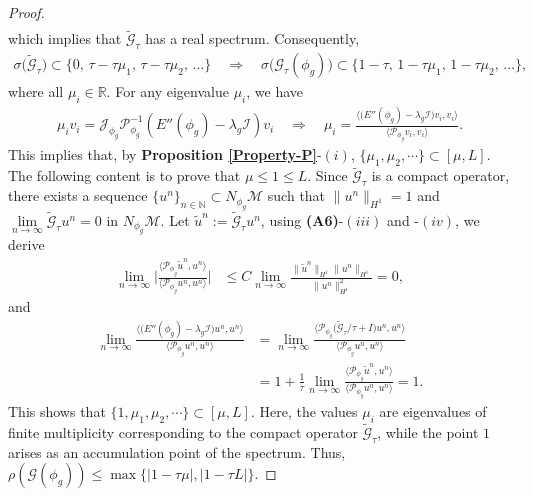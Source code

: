 \documentclass[preprint,3p]{elsarticle}
\begin{document}
\begin{proof}
{\begin{align*}
	\end{align*}
	which implies that $\widetilde{\mathcal{G}}_{\tau}$ has a real spectrum. Consequently,
	\begin{align*}
		\sigma\big(\widetilde{\mathcal{G}}_{\tau}\big) \subset \big\{0,\, \tau - \tau\mu_1,\, \tau - \tau\mu_2,\, \dots \big\}
		\quad \Longrightarrow \quad
		\sigma\big(\mathcal{G}_{\tau}(\phi_g)\big) \subset \big\{1 - \tau,\, 1 - \tau\mu_1,\, 1 - \tau\mu_2,\, \dots \big\},
	\end{align*}
	where all $\mu_i \in \mathbb{R}$.} For any eigenvalue $\mu_i$, we have
	\begin{align*}
		\mu_iv_i=\mathcal{J}_{\phi_g}\mathcal{P}^{-1}_{\phi_g} \left(E''(\phi_g) - \lambda_g \mathcal{I}\right)v_i\quad\Longrightarrow\quad\mu_i=\frac{\big\langle\big(E''(\phi_g)-\lambda_g\mathcal{I}\big)v_i,v_i\big\rangle}{\big\langle\mathcal{P}_{\phi_g}v_i,v_i\big\rangle}.
	\end{align*}
	This implies that, by {\bf Proposition \ref{Property-P}}-$(i)$, $\big\{\mu_1,\mu_2,\cdots\big\}\subset[\mu,L]$. The following content is to prove that $\mu\le1\le L$. Since $\widetilde{\mathcal{G}}_{\tau}$ is a compact operator, there exists a sequence $\{u^n\}_{n\in\mathbb{N}}\subset N_{\phi_g}\mathcal{M}$ such that $\big\|u^n\big\|_{H^1}=1$ and $\lim\limits_{n\to\infty}\widetilde{\mathcal{G}}_{\tau}u^n=0$ in $N_{\phi_g}\mathcal{M}$. Let $\widetilde{u}^n:=\widetilde{\mathcal{G}}_{\tau}u^n$, using {\bf(A6)}-$(iii)$ and -$(iv)$, we derive
	\begin{align*}
		\lim\limits_{n\to\infty}\Bigg|\frac{\big\langle\mathcal{P}_{\phi_g}\widetilde{u}^n,u^n\big\rangle}{\big\langle\mathcal{P}_{\phi_g}u^n,u^n\big\rangle}\Bigg|&\le C\lim\limits_{n\to\infty} 	\frac{\big\|\widetilde{u}^n\big\|_{H^1}\big\|u^n\big\|_{H^1}}{\big\|u^n\big\|^2_{H^1}}=0,
	\end{align*}
	and
	\begin{align*}
		\lim\limits_{n\to\infty}\frac{\big\langle\big(E''(\phi_g)-\lambda_g\mathcal{I}\big)u^n,u^n\big\rangle}{\big\langle\mathcal{P}_{\phi_g}u^n,u^n\big\rangle}&=\lim\limits_{n\to\infty}\frac{\big\langle\mathcal{P}_{\phi_g}\big(\widetilde{\mathcal{G}}_{\tau}/\tau+I\big)u^n,u^n\big\rangle}{\big\langle\mathcal{P}_{\phi_g}u^n,u^n\big\rangle}\\
		&=1+\frac{1}{\tau}\lim\limits_{n\to\infty}\frac{\big\langle\mathcal{P}_{\phi_g}\widetilde{u}^n,u^n\big\rangle}{\big\langle\mathcal{P}_{\phi_g}u^n,u^n\big\rangle}=1.
	\end{align*}
	This shows that $\big\{1,\mu_1,\mu_2,\cdots\big\}\subset[\mu,L]$. {Here, the values $\mu_i$ are eigenvalues of finite multiplicity corresponding to the compact operator $\widetilde{\mathcal{G}}_{\tau}$, while the point $1$ arises as an accumulation point of the spectrum.} Thus, $\rho\left(\mathcal{G}(\phi_g)\right) \le\max\big\{|1-\tau\mu|,|1-\tau L|\big\}$.
\end{proof}
\end{document}

